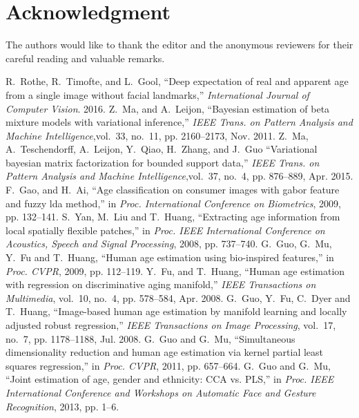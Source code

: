 \documentclass[journal]{IEEEtran}
\begin{document}
\appendices

\section*{Acknowledgment}
The authors would like to thank the editor and the anonymous reviewers for their careful reading and valuable remarks.


\ifCLASSOPTIONcaptionsoff
  \newpage
\fi







\begin{thebibliography}{1}
R.~Rothe, R.~Timofte, and L.~Gool, ``Deep expectation of real and apparent age from a single image without facial landmarks,'' \emph{International Journal of Computer Vision}. 2016.
Z.~Ma, and A.~Leijon, ``Bayesian estimation of beta mixture models with variational inference,'' \emph{IEEE Trans. on Pattern Analysis and Machine Intelligence},vol.~33, no.~11,
  pp. 2160--2173, Nov. 2011.
Z.~Ma, A.~Teschendorff, A.~Leijon, Y.~Qiao, H.~Zhang, and J.~Guo ``Variational bayesian matrix factorization for bounded support data,'' \emph{IEEE Trans. on Pattern Analysis and Machine Intelligence},vol.~37, no.~4,
  pp. 876--889, Apr. 2015.
F.~Gao, and H.~Ai, ``Age classification on consumer images with gabor feature and fuzzy lda method,'' in \emph{Proc. International Conference on Biometrics}, 2009, pp. 132--141.
S.~Yan, M.~Liu and T.~Huang, ``Extracting age information from local spatially flexible patches,'' in \emph{Proc. IEEE International Conference on Acoustics, Speech and Signal Processing}, 2008, pp. 737--740.
G.~Guo, G.~Mu, Y.~Fu and T.~Huang, ``Human age estimation using bio-inspired features,'' in \emph{Proc. CVPR}, 2009, pp. 112--119.
Y.~Fu, and T.~Huang, ``Human age estimation with regression on discriminative aging manifold,'' \emph{IEEE Transactions on Multimedia}, vol.~10, no.~4,
  pp. 578--584, Apr. 2008.
G.~Guo, Y.~Fu, C.~Dyer and T.~Huang, ``Image-based human age estimation by manifold learning and locally adjusted robust regression,'' \emph{IEEE Transactions on Image Processing}, vol.~17, no.~7, pp. 1178--1188, Jul. 2008.
G.~Guo and G.~Mu, ``Simultaneous dimensionality reduction and human age estimation via kernel partial least squares regression,'' in \emph{Proc. CVPR}, 2011, pp. 657--664.
G.~Guo and G.~Mu, ``Joint estimation of age, gender and ethnicity: CCA vs. PLS,'' in \emph{Proc. IEEE International Conference and Workshops on Automatic Face and Gesture Recognition}, 2013, pp. 1--6.

\end{thebibliography}
\end{document}
